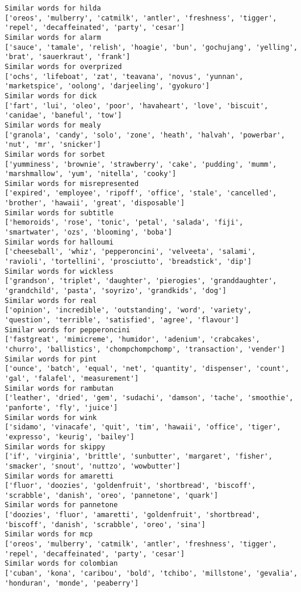 \documentclass[11pt]{article}
\begin{document}
\begin{Verbatim}[commandchars=\\\{\}]
Similar words for hilda
['oreos', 'mulberry', 'catmilk', 'antler', 'freshness', 'tigger', 'repel', 'decaffeinated', 'party', 'cesar']
Similar words for alarm
['sauce', 'tamale', 'relish', 'hoagie', 'bun', 'gochujang', 'yelling', 'brat', 'sauerkraut', 'frank']
Similar words for overprized
['ochs', 'lifeboat', 'zat', 'teavana', 'novus', 'yunnan', 'marketspice', 'oolong', 'darjeeling', 'gyokuro']
Similar words for dick
['fart', 'lui', 'oleo', 'poor', 'havaheart', 'love', 'biscuit', 'canidae', 'baneful', 'tow']
Similar words for mealy
['granola', 'candy', 'solo', 'zone', 'heath', 'halvah', 'powerbar', 'nut', 'mr', 'snicker']
Similar words for sorbet
['yumminess', 'brownie', 'strawberry', 'cake', 'pudding', 'mumm', 'marshmallow', 'yum', 'nitella', 'cooky']
Similar words for misrepresented
['expired', 'employee', 'ripoff', 'office', 'stale', 'cancelled', 'brother', 'hawaii', 'great', 'disposable']
Similar words for subtitle
['hemoroids', 'rose', 'tonic', 'petal', 'salada', 'fiji', 'smartwater', 'ozs', 'blooming', 'boba']
Similar words for halloumi
['cheeseball', 'whiz', 'pepperoncini', 'velveeta', 'salami', 'ravioli', 'tortellini', 'prosciutto', 'breadstick', 'dip']
Similar words for wickless
['grandson', 'triplet', 'daughter', 'pierogies', 'granddaughter', 'grandchild', 'pasta', 'soyrizo', 'grandkids', 'dog']
Similar words for real
['opinion', 'incredible', 'outstanding', 'word', 'variety', 'question', 'terrible', 'satisfied', 'agree', 'flavour']
Similar words for pepperoncini
['fastgreat', 'mimicreme', 'humidor', 'adenium', 'crabcakes', 'churro', 'ballistics', 'chompchompchomp', 'transaction', 'vender']
Similar words for pint
['ounce', 'batch', 'equal', 'net', 'quantity', 'dispenser', 'count', 'gal', 'falafel', 'measurement']
Similar words for rambutan
['leather', 'dried', 'gem', 'sudachi', 'damson', 'tache', 'smoothie', 'panforte', 'fly', 'juice']
Similar words for wink
['sidamo', 'vinacafe', 'quit', 'tim', 'hawaii', 'office', 'tiger', 'expresso', 'keurig', 'bailey']
Similar words for skippy
['if', 'virginia', 'brittle', 'sunbutter', 'margaret', 'fisher', 'smacker', 'snout', 'nuttzo', 'wowbutter']
Similar words for amaretti
['fluor', 'doozies', 'goldenfruit', 'shortbread', 'biscoff', 'scrabble', 'danish', 'oreo', 'pannetone', 'quark']
Similar words for pannetone
['doozies', 'fluor', 'amaretti', 'goldenfruit', 'shortbread', 'biscoff', 'danish', 'scrabble', 'oreo', 'sina']
Similar words for mcp
['oreos', 'mulberry', 'catmilk', 'antler', 'freshness', 'tigger', 'repel', 'decaffeinated', 'party', 'cesar']
Similar words for colombian
['cuban', 'kona', 'caribou', 'bold', 'tchibo', 'millstone', 'gevalia', 'honduran', 'monde', 'peaberry']

\end{Verbatim}
\end{document}

